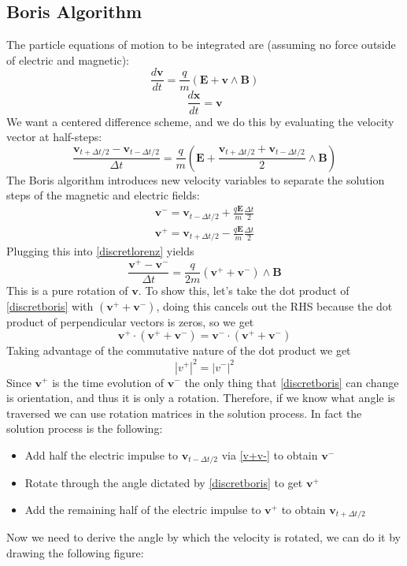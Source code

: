 \documentclass[12pt]{article}
\begin{document}
\subsection{Boris Algorithm}
The particle equations of motion to be integrated are (assuming no force outside of electric and magnetic): 
$$\frac{d\textbf{v}}{dt}=\frac{q}{m}\left(\textbf{E}+\textbf{v}\wedge\textbf{B}\right)$$
$$\frac{d\textbf{x}}{dt}=\textbf{v}$$
We want a centered difference scheme, and we do this by evaluating the velocity vector at half-steps:
\begin{equation}\label{discretlorenz}
\frac{\textbf{v}_{t+\Delta t/2}-\textbf{v}_{t-\Delta t/2}}{\Delta t}=\frac{q}{m}\left(\textbf{E}+\frac{\textbf{v}_{t+\Delta t/2}+\textbf{v}_{t-\Delta t/2}}{2}\wedge\textbf{B}\right)
\end{equation}
The Boris algorithm introduces new velocity variables to separate the solution steps of the magnetic and electric fields:
\begin{equation}\label{v+v-}
\begin{split}
\textbf{v}^-=\textbf{v}_{t-\Delta t/2}+\frac{q\textbf{E}}{m}\frac{\Delta t}{2}\\
\textbf{v}^+=\textbf{v}_{t+\Delta t/2}-\frac{q\textbf{E}}{m}\frac{\Delta t}{2}
\end{split}
\end{equation}
Plugging this into \eqref{discretlorenz} yields
\begin{equation}\label{discretboris}
\frac{\textbf{v}^+-\textbf{v}^-}{\Delta t}=\frac{q}{2m}(\textbf{v}^++\textbf{v}^-)\wedge\textbf{B}
\end{equation}
This is a pure rotation of $\textbf{v}$. To show this, let's take the dot product of \eqref{discretboris} with $(\textbf{v}^++\textbf{v}^-)$, doing this cancels out the RHS because the dot product of perpendicular vectors is zeros, so we get
$$\textbf{v}^+\cdot(\textbf{v}^++\textbf{v}^-)=\textbf{v}^-\cdot(\textbf{v}^++\textbf{v}^-)$$
Taking advantage of the commutative nature of the dot product we get
$$|v^+|^2=|v^-|^2$$
Since $\textbf{v}^+$ is the time evolution of $\textbf{v}^-$ the only thing that \eqref{discretboris} can change is orientation, and thus it is only a rotation. Therefore, if we know what angle is traversed we can use rotation matrices in the solution process. In fact the solution process is the following:
\begin{itemize}
\item Add half the electric impulse to $\textbf{v}_{t-\Delta t/2}$ via \eqref{v+v-} to obtain $\textbf{v}^-$
\item Rotate through the angle dictated by \eqref{discretboris} to get $\textbf{v}^+$
\item Add the remaining half of the electric impulse to $\textbf{v}^+$ to obtain $\textbf{v}_{t+\Delta t/2}$
\end{itemize}
Now we need to derive the angle by which the velocity is rotated, we can do it by drawing the following figure:
\end{document}
